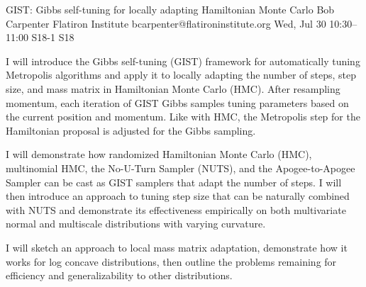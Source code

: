 \documentclass[12pt,lettersize,oneside]{book} %
\begin{document}
\begin{talk}
  {GIST: Gibbs self-tuning for locally adapting Hamiltonian Monte Carlo}%
  {Bob Carpenter}%
  {Flatiron Institute}%
  {bcarpenter@flatironinstitute.org}%
  {}%
  {}%
  {Wed, Jul 30 10:30--11:00}%
  {S18-1}%
  {S18}%
  {}%
  
    
   
I will introduce the Gibbs self-tuning (GIST) framework for automatically tuning Metropolis algorithms and apply it to locally adapting the number of steps, step size, and mass matrix in Hamiltonian Monte Carlo (HMC).  After resampling momentum, each iteration of GIST Gibbs samples tuning parameters based on the current position and momentum.  Like with HMC, the Metropolis step for the Hamiltonian proposal is adjusted for the Gibbs sampling.

I will demonstrate how randomized Hamiltonian Monte Carlo (HMC), multinomial HMC, the No-U-Turn Sampler (NUTS), and the Apogee-to-Apogee Sampler can be cast as GIST samplers that adapt the number of steps.  I will then introduce an approach to tuning step size that can be naturally combined with NUTS and demonstrate its effectiveness empirically on both multivariate normal and multiscale distributions with varying curvature.  

I will sketch an approach to local mass matrix adaptation, demonstrate how it works for log concave distributions, then outline the problems remaining for efficiency and generalizability to other distributions.

\end{talk}
\end{document}
